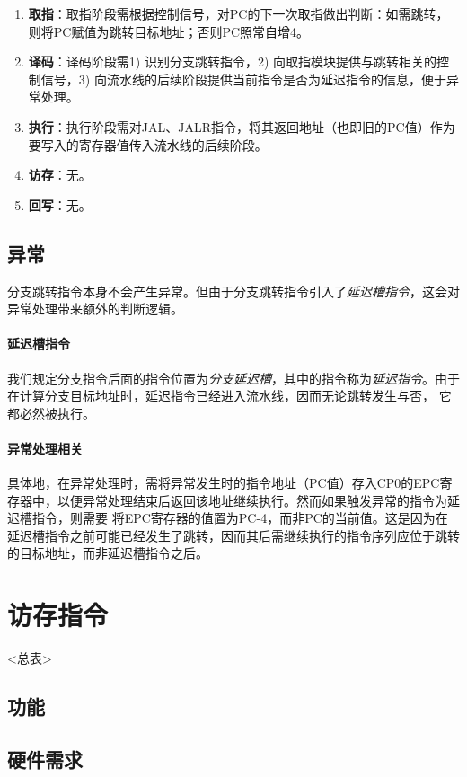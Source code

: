 \begin{enumerate}
    \item {\bf 取指}：取指阶段需根据控制信号，对PC的下一次取指做出判断：如需跳转，则将PC赋值为跳转目标地址；否则PC照常自增4。
    \item {\bf 译码}：译码阶段需1) 识别分支跳转指令，2) 向取指模块提供与跳转相关的控制信号，3) 向流水线的后续阶段提供当前指令是否为延迟指令的信息，便于异常处理。
    \item {\bf 执行}：执行阶段需对JAL、JALR指令，将其返回地址（也即旧的PC值）作为要写入的寄存器值传入流水线的后续阶段。
    \item {\bf 访存}：无。
    \item {\bf 回写}：无。
\end{enumerate}

\subsection{异常}

分支跳转指令本身不会产生异常。但由于分支跳转指令引入了\emph{延迟槽指令}，这会对异常处理带来额外的判断逻辑。


\paragraph{延迟槽指令} 我们规定分支指令后面的指令位置为\emph{分支延迟槽}，其中的指令称为\emph{延迟指令}。由于在计算分支目标地址时，延迟指令已经进入流水线，因而无论跳转发生与否，
它都必然被执行。

\paragraph{异常处理相关} 具体地，在异常处理时，需将异常发生时的指令地址（PC值）存入CP0的EPC寄存器中，以便异常处理结束后返回该地址继续执行。然而如果触发异常的指令为延迟槽指令，则需要
将EPC寄存器的值置为PC-4，而非PC的当前值。这是因为在延迟槽指令之前可能已经发生了跳转，因而其后需继续执行的指令序列应位于跳转的目标地址，而非延迟槽指令之后。

\section{访存指令}
<总表>
    \subsection{功能}
    \subsection{硬件需求}
